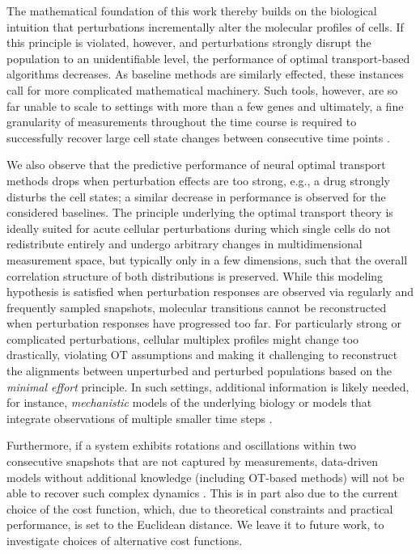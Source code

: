 The mathematical foundation of this work thereby builds on the biological intuition that perturbations incrementally alter the molecular profiles of cells. 
If this principle is violated, however, and perturbations strongly disrupt the population to an unidentifiable level, the performance of optimal transport-based algorithms decreases. As baseline methods are similarly effected, these instances call for more complicated mathematical machinery.
Such tools, however, are so far unable to scale to settings with more than a few genes \citep{heydari2022iqcell} and ultimately, a fine granularity of measurements throughout the time course is required to successfully recover large cell state changes between consecutive time points \citep{tritschler2019concepts}.

We also observe that the predictive performance of neural optimal transport methods drops when perturbation effects are too strong, e.g., a drug strongly disturbs the cell states; a similar decrease in performance is observed for the considered baselines.
The principle underlying the optimal transport theory is ideally suited for acute cellular perturbations during which single cells do not redistribute entirely and undergo arbitrary changes in multidimensional measurement space, but typically only in a few dimensions, such that the overall correlation structure of both distributions is preserved. While this modeling hypothesis is satisfied when perturbation responses are observed via regularly and frequently sampled snapshots, molecular transitions cannot be reconstructed when perturbation responses have progressed too far. For particularly strong or complicated perturbations, cellular multiplex profiles might change too drastically, violating OT assumptions and making it challenging to reconstruct the alignments between unperturbed and perturbed populations based on the \emph{minimal effort} principle.
In such settings, additional information is likely needed, for instance, \emph{mechanistic} models of the underlying biology or models that integrate observations of multiple smaller time steps \citep{raue2015data2dynamics, busch2015fundamental}. 

Furthermore, if a system exhibits rotations and oscillations within two consecutive snapshots that are not captured by measurements, data-driven models without additional knowledge (including OT-based methods) will not be able to recover such complex dynamics \citep{weinreb2018fundamental}. This is in part also due to the current choice of the cost function, which, due to theoretical constraints and practical performance, is set to the Euclidean distance. We leave it to future work, to investigate choices of alternative cost functions. 

